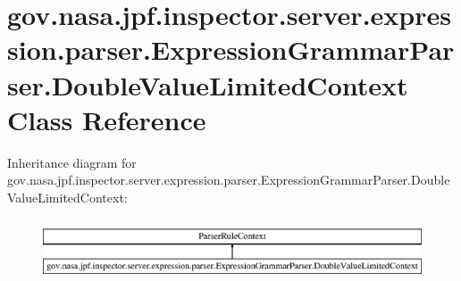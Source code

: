 \hypertarget{classgov_1_1nasa_1_1jpf_1_1inspector_1_1server_1_1expression_1_1parser_1_1_expression_grammar_pa747378014be7c4ab66961e5db1be8d25}{}\section{gov.\+nasa.\+jpf.\+inspector.\+server.\+expression.\+parser.\+Expression\+Grammar\+Parser.\+Double\+Value\+Limited\+Context Class Reference}
\label{classgov_1_1nasa_1_1jpf_1_1inspector_1_1server_1_1expression_1_1parser_1_1_expression_grammar_pa747378014be7c4ab66961e5db1be8d25}
Inheritance diagram for gov.\+nasa.\+jpf.\+inspector.\+server.\+expression.\+parser.\+Expression\+Grammar\+Parser.\+Double\+Value\+Limited\+Context\+:\begin{figure}[H]
\begin{center}
\leavevmode
\includegraphics[height=1.848185cm]{classgov_1_1nasa_1_1jpf_1_1inspector_1_1server_1_1expression_1_1parser_1_1_expression_grammar_pa747378014be7c4ab66961e5db1be8d25}
\end{center}
\end{figure}
